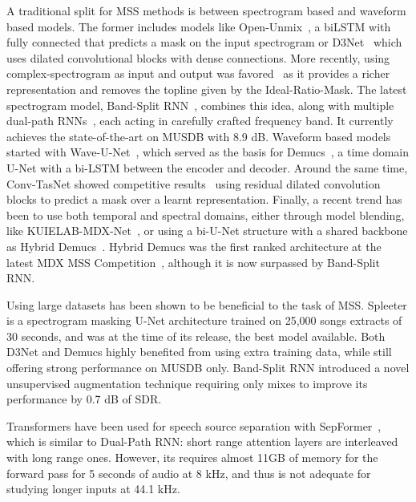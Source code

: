 \documentclass{article}
\newcommand{\alex}[1]{{\color{blue} A: #1}}
\newcommand{\simon}[1]{{\color{red} S: #1}}
\begin{document}
A traditional split for MSS methods is between spectrogram based and waveform based models.
The former includes models like Open-Unmix~\cite{umx}, a biLSTM with fully connected that
predicts a mask on the input spectrogram or D3Net~\cite{d3net} which uses dilated convolutional blocks with dense connections. More recently, using complex-spectrogram as input and output was favored~\cite{lasaft} as it provides a richer representation and removes the topline given by the Ideal-Ratio-Mask.
The latest spectrogram model, Band-Split RNN~\cite{bsrnn}, combines this idea, along with multiple
dual-path RNNs~\cite{luo2020dual}, each acting in carefully crafted frequency band. 
It currently achieves the state-of-the-art on MUSDB with 8.9 dB.
Waveform based models started with Wave-U-Net~\cite{waveunet}, which served as the basis for Demucs~\cite{demucsv2}, a 
time domain U-Net with a bi-LSTM between the encoder and decoder. Around the same time, Conv-TasNet
showed competitive results~\cite{convtasnet,demucsv2} using residual dilated convolution blocks to predict
a mask over a learnt representation. Finally, a recent trend has been to use both temporal and spectral domains, either through model blending, like KUIELAB-MDX-Net~\cite{kuielab}, or using
a bi-U-Net structure with a shared backbone as Hybrid Demucs~\cite{defossez2021hybrid}. Hybrid Demucs
was the first ranked architecture at the latest MDX MSS Competition~\cite{mdx2021}, although
it is now surpassed by Band-Split RNN.

Using large datasets has been shown to be beneficial to the task of MSS.
Spleeter \cite{spleeter} is a spectrogram masking U-Net architecture trained on 25,000 songs extracts of 30 seconds,
and was at the time of its release, the best model available. Both D3Net and Demucs highly benefited from
using extra training data, while still offering strong performance on MUSDB only.
Band-Split RNN introduced a novel unsupervised augmentation technique requiring only mixes to improve its 
performance by 0.7 dB of SDR.

Transformers have been used for speech source separation with SepFormer~\cite{subakan2021attention},  which is similar to Dual-Path RNN: short range attention layers are interleaved with long range ones.
However, its requires almost 11GB of memory for the forward pass for 5 seconds of audio at 8 kHz, and thus is not 
adequate for studying longer inputs at 44.1 kHz.
\end{document}
